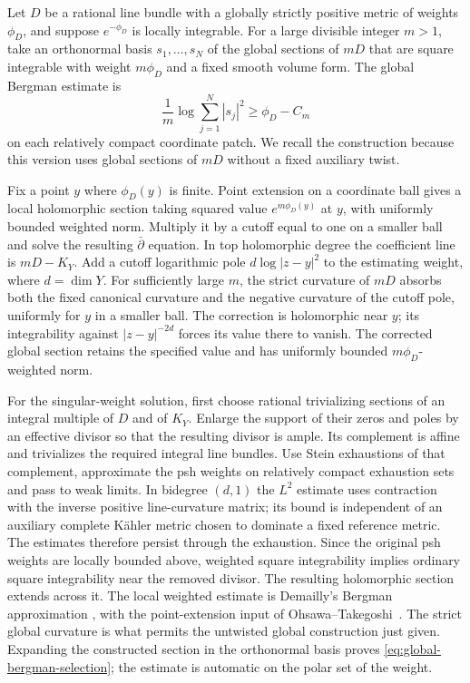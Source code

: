 Let $D$ be a rational line bundle with a globally strictly positive
metric of weights $\phi_D$, and suppose $e^{-\phi_D}$ is locally
integrable.  For a large divisible integer $m>1$, take an orthonormal
basis $s_1,\ldots,s_N$ of the global sections of $mD$ that are square
integrable with weight $m\phi_D$ and a fixed smooth volume form.
The global Bergman estimate is
\begin{equation}\label{eq:global-bergman-selection}
 \frac1m\log\sum_{j=1}^N|s_j|^2\ge\phi_D-C_m
\end{equation}
on each relatively compact coordinate patch.  We recall the
construction because this version uses global sections of $mD$
without a fixed auxiliary twist.

Fix a point $y$ where $\phi_D(y)$ is finite.  Point extension on a
coordinate ball gives a local holomorphic section taking squared
value $e^{m\phi_D(y)}$ at $y$, with uniformly bounded weighted norm.
Multiply it by a cutoff equal to one on a smaller ball and solve the
resulting $\bar\partial$ equation.  In top holomorphic degree the
coefficient line is $mD-K_Y$.  Add a cutoff logarithmic pole
$d\log|z-y|^2$ to the estimating weight, where $d=\dim Y$.
For sufficiently large $m$, the strict curvature of $mD$ absorbs both
the fixed canonical curvature and the negative curvature of the cutoff
pole, uniformly for $y$ in a smaller ball.  The correction is
holomorphic near $y$; its integrability against $|z-y|^{-2d}$ forces
its value there to vanish.  The corrected global section retains the
specified value and has uniformly bounded $m\phi_D$-weighted norm.

For the singular-weight solution, first choose rational trivializing
sections of an integral multiple of $D$ and of $K_Y$.  Enlarge the
support of their zeros and poles by an effective divisor so that the
resulting divisor is ample.  Its complement is affine and trivializes
the required integral line bundles.  Use Stein exhaustions of that
complement, approximate the psh weights on relatively compact
exhaustion sets and pass to weak limits.  In bidegree $(d,1)$ the
$L^2$ estimate uses contraction with the inverse positive
line-curvature matrix; its bound is independent of an auxiliary
complete K\"ahler metric chosen to dominate a fixed reference metric.
The estimates therefore persist through the exhaustion.  Since the
original psh weights are locally bounded above, weighted square
integrability implies ordinary square integrability near the removed
divisor.  The resulting holomorphic section extends across it.
The local weighted estimate is Demailly's Bergman approximation
\cite[Section~1, Theorem~1.2]{Demailly2015}, with the point-extension
input of Ohsawa--Takegoshi~\cite{OhsawaTakegoshi1987}.  The strict
global curvature is what permits the untwisted global construction
just given.
Expanding the constructed section in the orthonormal basis proves
\eqref{eq:global-bergman-selection}; the estimate is automatic on the
polar set of the weight.


